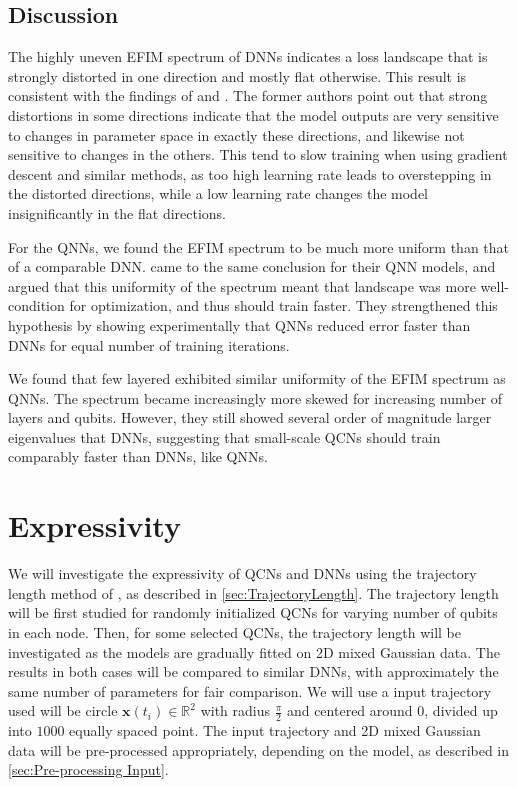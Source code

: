 \subsection{Discussion}\label{sec:Loss Landscape Discussion}
The highly uneven EFIM spectrum of DNNs indicates a loss landscape that is strongly distorted in one direction and mostly flat otherwise. This result is consistent with the findings of \citet{karakida2019universal} and \citet{abbas2020power}. The former authors point out that strong distortions in some directions indicate that the model outputs are very sensitive to changes in parameter space in exactly these directions, and likewise not sensitive to changes in the others. This tend to slow training when using gradient descent and similar methods, as too high learning rate leads to overstepping in the distorted directions, while a low learning rate changes the model insignificantly in the flat directions. 

For the QNNs, we found the EFIM spectrum to be much more uniform than that of a comparable DNN. \citet{abbas2020power} came to the same conclusion for their QNN models, and argued that this uniformity of the spectrum meant that landscape was more well-condition for optimization, and thus should train faster. They strengthened this hypothesis by showing experimentally that QNNs reduced error faster than DNNs for equal number of training iterations. 

We found that few layered exhibited similar uniformity of the EFIM spectrum as QNNs. The spectrum became increasingly more skewed for increasing number of layers and qubits. However, they still showed several order of magnitude larger eigenvalues that DNNs, suggesting that small-scale QCNs should train comparably faster than DNNs, like QNNs.

\section{Expressivity}\label{sec:Expressivity}
We will investigate the expressivity of QCNs and DNNs using the trajectory length method of \citet{raghu2017expressive}, as described in \autoref{sec:TrajectoryLength}. The trajectory length will be first studied for randomly initialized QCNs for varying number of qubits in each node. Then, for some selected QCNs, the trajectory length will be investigated as the models are gradually fitted on 2D mixed Gaussian data. The results in both cases will be compared to similar DNNs, with approximately the same number of parameters for fair comparison. We will use a input trajectory  used will be circle $\boldsymbol{x}(t_i) \in \mathbb{R}^2$ with radius $\frac{\pi}{2}$ and centered around $0$, divided up into $1000$ equally spaced point. The input trajectory and 2D mixed Gaussian data will be pre-processed appropriately, depending on the model, as described in \autoref{sec:Pre-processing Input}.

